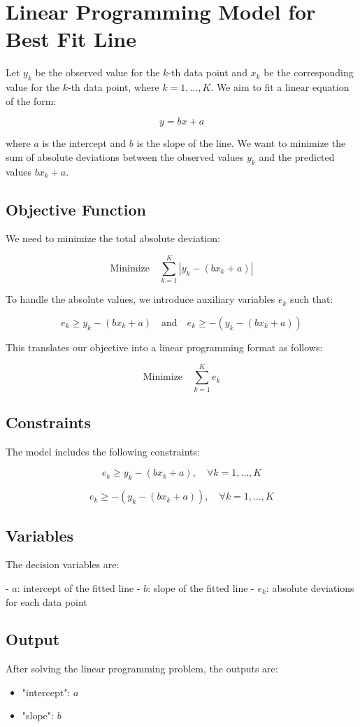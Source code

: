 \documentclass{article}
\begin{document}
\section*{Linear Programming Model for Best Fit Line}

Let \( y_k \) be the observed value for the \( k \)-th data point and \( x_k \) be the corresponding value for the \( k \)-th data point, where \( k = 1, \ldots, K \). We aim to fit a linear equation of the form:

\[
y = bx + a
\]

where \( a \) is the intercept and \( b \) is the slope of the line. We want to minimize the sum of absolute deviations between the observed values \( y_k \) and the predicted values \( bx_k + a \).

\subsection*{Objective Function}

We need to minimize the total absolute deviation:

\[
\text{Minimize} \quad \sum_{k=1}^{K} |y_k - (bx_k + a)|
\]

To handle the absolute values, we introduce auxiliary variables \( e_k \) such that:

\[
e_k \geq y_k - (bx_k + a) \quad \text{and} \quad e_k \geq -(y_k - (bx_k + a))
\]

This translates our objective into a linear programming format as follows:

\[
\text{Minimize} \quad \sum_{k=1}^{K} e_k
\]

\subsection*{Constraints}

The model includes the following constraints:

\[
e_k \geq y_k - (bx_k + a), \quad \forall k = 1, \ldots, K
\]

\[
e_k \geq -(y_k - (bx_k + a)), \quad \forall k = 1, \ldots, K
\]

\subsection*{Variables}

The decision variables are:

- \( a \): intercept of the fitted line
- \( b \): slope of the fitted line
- \( e_k \): absolute deviations for each data point

\subsection*{Output}

After solving the linear programming problem, the outputs are:

\begin{itemize}
    \item "intercept": \( a \)
    \item "slope": \( b \)
\end{itemize}
\end{document}
